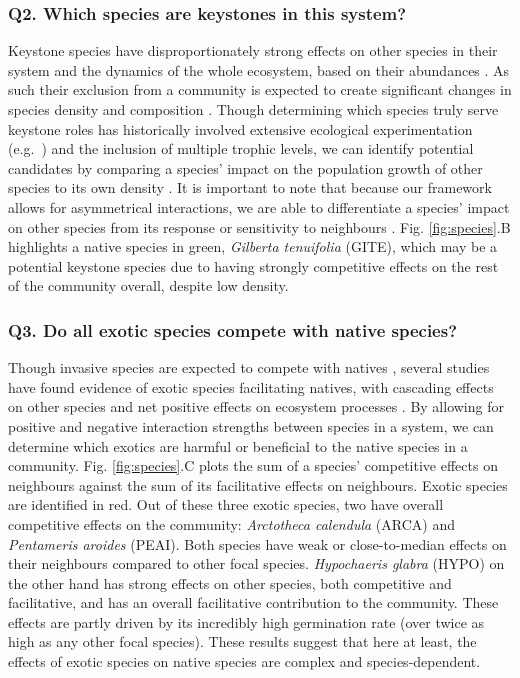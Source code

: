 \documentclass[a4,12pt]{article}
\begin{document}
\begin{refsection}
    \subsubsection*{Q2. Which species are keystones in this system?}
    Keystone species have disproportionately strong effects on other species in their system and the dynamics of the whole ecosystem, based on their abundances \parencite{Power1996, Piraino2002, Libralato2006}. As such their exclusion from a community is expected to create significant changes in species density and composition \parencite{Paine1969}. Though determining which species truly serve keystone roles has historically involved extensive ecological experimentation (e.g.\ \cite{Paine1992}) and the inclusion of multiple trophic levels, we can identify potential candidates by comparing a species' impact on the population growth of other species to its own density \parencite{Libralato2006}. It is important to note that because our framework allows for asymmetrical interactions, we are able to differentiate a species' impact on other species from its response or sensitivity to neighbours \parencite{Broekman2020}. Fig. \ref{fig:species}.B highlights a native species in green, \textit{Gilberta tenuifolia} (GITE), which may be a potential keystone species due to having strongly competitive effects on the rest of the community overall, despite low density. 

    \subsubsection*{Q3. Do all exotic species compete with native species?}
    Though invasive species are expected to compete with natives \parencite{Naeem2000, Corbin2004, Riley2008, Zheng2015}, several studies have found evidence of exotic species facilitating natives, with cascading effects on other species and net positive effects on ecosystem processes \parencite{Rodriguez2006, Ramus2017, Wainwright2019}. By allowing for positive and negative interaction strengths between species in a system, we can determine which exotics are harmful or beneficial to the native species in a community. Fig. \ref{fig:species}.C plots the sum of a species' competitive effects on neighbours against the sum of its facilitative effects on neighbours. Exotic species are identified in red. Out of these three exotic species, two have overall competitive effects on the community: \textit{Arctotheca calendula} (ARCA) and \textit{Pentameris aroides} (PEAI). Both species have weak or close-to-median effects on their neighbours compared to other focal species. \textit{Hypochaeris glabra} (HYPO) on the other hand has strong effects on other species, both competitive and facilitative, and has an overall facilitative contribution to the community. These effects are partly driven by its incredibly high germination rate (over twice as high as any other focal species). These results suggest that here at least, the effects of exotic species on native species are complex and species-dependent.



\end{refsection}
\end{document}
